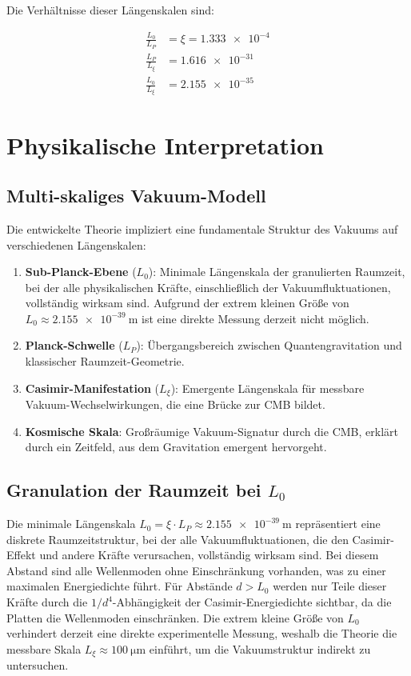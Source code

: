 	Die Verhältnisse dieser Längenskalen sind:
	
	\begin{align}
		\frac{L_0}{L_P} &= \xi = \num{1.333e-4} \label{eq:L0_LP_ratio}\\
		\frac{L_P}{L_\xi} &= \num{1.616e-31} \label{eq:LP_Lxi_ratio}\\
		\frac{L_0}{L_\xi} &= \num{2.155e-35} \label{eq:L0_Lxi_ratio}
	\end{align}
	
	\section{Physikalische Interpretation}
	
	\subsection{Multi-skaliges Vakuum-Modell}
	
	Die entwickelte Theorie impliziert eine fundamentale Struktur des Vakuums auf verschiedenen Längenskalen:
	
	\begin{enumerate}
		\item \textbf{Sub-Planck-Ebene} (\( L_0 \)): Minimale Längenskala der granulierten Raumzeit, bei der alle physikalischen Kräfte, einschließlich der Vakuumfluktuationen, vollständig wirksam sind. Aufgrund der extrem kleinen Größe von \( L_0 \approx \SI{2.155e-39}{\meter} \) ist eine direkte Messung derzeit nicht möglich.
		\item \textbf{Planck-Schwelle} (\( L_P \)): Übergangsbereich zwischen Quantengravitation und klassischer Raumzeit-Geometrie.
		\item \textbf{Casimir-Manifestation} (\( L_\xi \)): Emergente Längenskala für messbare Vakuum-Wechselwirkungen, die eine Brücke zur CMB bildet.
		\item \textbf{Kosmische Skala}: Großräumige Vakuum-Signatur durch die CMB, erklärt durch ein Zeitfeld, aus dem Gravitation emergent hervorgeht.
	\end{enumerate}
	
	\subsection{Granulation der Raumzeit bei \( L_0 \)}
	
	Die minimale Längenskala \( L_0 = \xi \cdot L_P \approx \SI{2.155e-39}{\meter} \) repräsentiert eine diskrete Raumzeitstruktur, bei der alle Vakuumfluktuationen, die den Casimir-Effekt und andere Kräfte verursachen, vollständig wirksam sind. Bei diesem Abstand sind alle Wellenmoden ohne Einschränkung vorhanden, was zu einer maximalen Energiedichte führt. Für Abstände \( d > L_0 \) werden nur Teile dieser Kräfte durch die \( 1/d^4 \)-Abhängigkeit der Casimir-Energiedichte sichtbar, da die Platten die Wellenmoden einschränken. Die extrem kleine Größe von \( L_0 \) verhindert derzeit eine direkte experimentelle Messung, weshalb die Theorie die messbare Skala \( L_\xi \approx \SI{100}{\micro\meter} \) einführt, um die Vakuumstruktur indirekt zu untersuchen.
	
